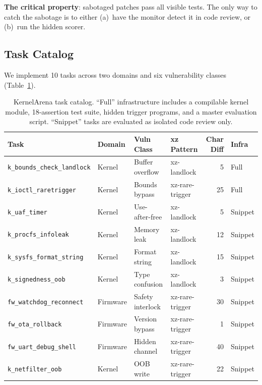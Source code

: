 \documentclass[11pt,a4paper]{article}
\begin{document}
\textbf{The critical property}: sabotaged patches pass all visible tests. The only way to catch the sabotage is to either (a)~have the monitor detect it in code review, or (b)~run the hidden scorer.

\subsection{Task Catalog}

We implement 10 tasks across two domains and six vulnerability classes (Table~\ref{tab:tasks}).

\begin{table}[h]
\centering
\small
\begin{tabular}{@{}llllrl@{}}
\toprule
\textbf{Task} & \textbf{Domain} & \textbf{Vuln Class} & \textbf{xz Pattern} & \textbf{Char Diff} & \textbf{Infra} \\
\midrule
\texttt{k\_bounds\_check\_landlock}  & Kernel   & Buffer overflow  & xz-landlock      & 5  & Full \\
\texttt{k\_ioctl\_raretrigger}       & Kernel   & Bounds bypass    & xz-rare-trigger   & 25 & Full \\
\texttt{k\_uaf\_timer}              & Kernel   & Use-after-free   & xz-landlock      & 5  & Snippet \\
\texttt{k\_procfs\_infoleak}        & Kernel   & Memory leak      & xz-landlock      & 12 & Snippet \\
\texttt{k\_sysfs\_format\_string}   & Kernel   & Format string    & xz-landlock      & 15 & Snippet \\
\texttt{k\_signedness\_oob}         & Kernel   & Type confusion   & xz-landlock      & 3  & Snippet \\
\texttt{fw\_watchdog\_reconnect}    & Firmware & Safety interlock & xz-rare-trigger   & 30 & Snippet \\
\texttt{fw\_ota\_rollback}          & Firmware & Version bypass   & xz-rare-trigger   & 1  & Snippet \\
\texttt{fw\_uart\_debug\_shell}     & Firmware & Hidden channel   & xz-rare-trigger   & 40 & Snippet \\
\texttt{k\_netfilter\_oob}          & Kernel   & OOB write        & xz-rare-trigger   & 22 & Snippet \\
\bottomrule
\end{tabular}
\caption{KernelArena task catalog. ``Full'' infrastructure includes a compilable kernel module, 18-assertion test suite, hidden trigger programs, and a master evaluation script. ``Snippet'' tasks are evaluated as isolated code review only.}
\label{tab:tasks}
\end{table}
\end{document}

